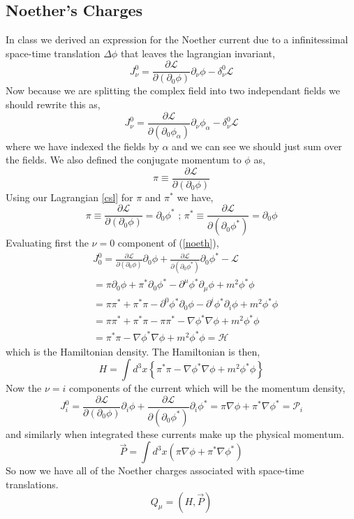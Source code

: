\documentclass{article}
\numberwithin{equation}{section}
\newcommand{\Lagr}{\mathcal{L}}  %
\newcommand{\dmu}{\partial_{\mu}}
\newcommand{\dnu}{\partial_{\nu}}
\newcommand{\Dmu}{\partial^{\mu}}
\newcommand{\dz} {\partial_0}
\newcommand{\Dz} {\partial^0}
\newcommand{\ddl}[1]{\frac{\partial \Lagr}{\partial(\partial_{#1} \phi)}}
\newcommand{\cddl}[1]{\frac{\partial \Lagr}{\partial(\partial_{#1} \phi^*)}}
\newcommand{\beq}{\begin{equation}}
\newcommand{\eeq}{\end{equation}}
\begin{document}
\subsection{Noether's Charges}
In class we derived an expression for the Noether current due to a infinitessimal space-time translation $\Delta \phi$ that leaves the lagrangian invariant,
\beq
    J^{0}_{\nu} = \ddl{0} \dnu \phi - \delta^{0}_{\nu}\Lagr
\eeq
Now because we are splitting the complex field into two independant fields we should rewrite this as,
\beq \label{noeth}
    J^{0}_{\nu} = \frac{\partial \Lagr}{\partial(\partial_{0}\phi_{\alpha})} \dnu \phi_{\alpha} - \delta^{0}_{\nu} \Lagr
\eeq
where we have indexed the fields by $\alpha$ and we can see we should just sum over the fields.
We also defined the conjugate momentum to $\phi$ as,
\beq
    \pi \equiv \ddl{0}
\eeq
Using our Lagrangian \ref{csl} for $\pi$ and $\pi^*$ we have,
\beq
    \pi \equiv \ddl{0} = \partial_{0} \phi^* \text{ ; } \pi^* \equiv \cddl{0} = \partial_{0} \phi
\eeq
Evaluating first the $\nu=0$ component of (\ref{noeth}),
\beq \begin{split}
    &J^{0}_{0} = \ddl{0} \partial_0 \phi + \cddl{0} \partial_0 \phi^* - \Lagr \\
    &= \pi \dz\phi + \pi^*\dz\phi^* - \Dmu\phi^* \dmu\phi + m^2 \phi^*\phi \\
    &= \pi\pi^* + \pi^*\pi - \Dz\phi^*\dz\phi- \partial^i\phi^* \partial_i\phi + m^2 \phi^*\phi \\
    &= \pi\pi^* + \pi^*\pi -\pi\pi^* - \nabla\phi^* \nabla \phi + m^2 \phi^* \phi \\
    &= \pi^*\pi - \nabla\phi^* \nabla \phi + m^2 \phi^* \phi = \mathcal{H}
\end{split} \eeq
which is the Hamiltonian density. The Hamiltonian is then,
\beq
    H = \int d^3x \left\{ \pi^*\pi - \nabla\phi^* \nabla \phi + m^2 \phi^* \phi   \right\}
\eeq
Now the $\nu=i$ components of the current which will be the momentum density,
\beq
    J^0_i = \ddl{0} \partial_i \phi + \cddl{0} \partial_i \phi^* = \pi \nabla\phi + \pi^*\nabla\phi^* = \mathcal{P}_i
\eeq
and similarly when integrated these currents make up the physical momentum.
\beq
    \vec{P} = \int d^3x (\pi\nabla\phi + \pi^*\nabla\phi^*)
\eeq
So now we have all of the Noether charges associated with space-time translations.
\beq
    Q_\mu = (H, \vec{P})
\eeq
\end{document}
